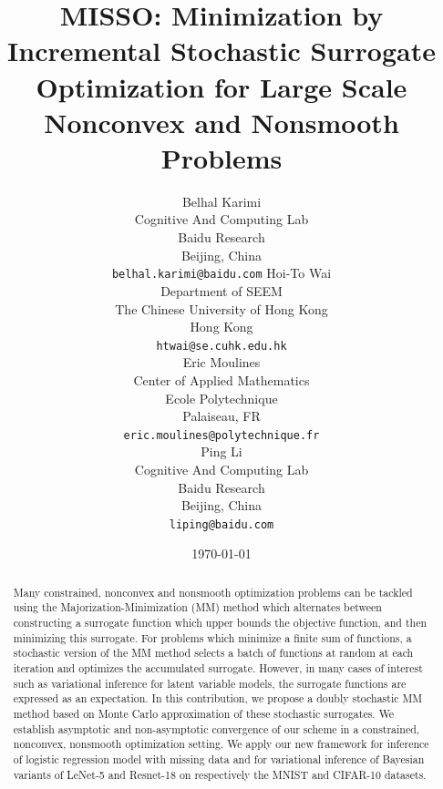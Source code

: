 \documentclass[11pt]{article}
\theoremstyle{t}
\begin{document}
\title{\vspace{-0.1in}MISSO: Minimization by Incremental Stochastic Surrogate Optimization for Large Scale Nonconvex and Nonsmooth Problems\vspace{-0.1in}}

\author{
  Belhal Karimi \\
  Cognitive And Computing Lab\\
  Baidu Research\\
  Beijing, China \\
  \texttt{belhal.karimi@baidu.com} 
   \And
   Hoi-To Wai \\
   Department of SEEM\\
   The Chinese University of Hong Kong\\
   Hong Kong \\
   \texttt{htwai@se.cuhk.edu.hk} \\
   \And
   Eric Moulines \\
   Center of Applied Mathematics\\
   Ecole Polytechnique\\
   Palaiseau, FR \\
   \texttt{eric.moulines@polytechnique.fr} \\
   \And
  Ping Li \\
  Cognitive And Computing Lab\\
  Baidu Research\\
  Beijing, China \\
  \texttt{liping@baidu.com} \\
}

\date{\today}

\maketitle

\begin{abstract}\vspace{-0.1in}
Many constrained, nonconvex and nonsmooth optimization problems can be tackled using the Majorization-Minimization (MM) method which alternates between constructing a surrogate function which upper bounds the objective function, and then minimizing this surrogate.
For problems which minimize a finite sum of functions, a stochastic version of the MM method selects a batch of functions at random at each iteration and optimizes the accumulated surrogate.
However, in many cases of interest such as  variational inference for latent variable models, the surrogate functions are expressed as an expectation. In this contribution, we propose a doubly stochastic MM method based on Monte Carlo approximation of these stochastic surrogates.
We establish asymptotic and non-asymptotic convergence of our scheme in a constrained, nonconvex, nonsmooth optimization setting.
We apply our new framework for inference of logistic regression model with missing data and for variational inference of Bayesian variants of LeNet-5 and Resnet-18 on respectively the MNIST and CIFAR-10 datasets.
\end{abstract}
\end{document}
